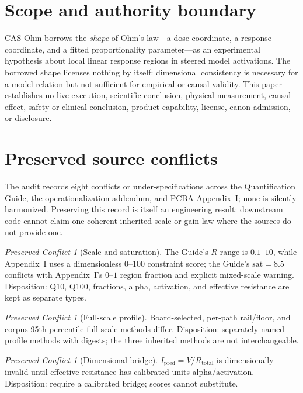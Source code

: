 \documentclass[11pt]{amsart}
\theoremstyle{definition}
\theoremstyle{remark}
\newtheorem{conflict}[theorem]{Preserved Conflict}
\begin{document}
\maketitle

\section{Scope and authority boundary}

CAS-Ohm borrows the \emph{shape} of Ohm's law---a dose coordinate, a response coordinate, and a fitted proportionality parameter---as an experimental hypothesis about local linear response regions in steered model activations. The borrowed shape licenses nothing by itself: dimensional consistency is necessary for a model relation \cite{buckingham} but not sufficient for empirical or causal validity. This paper establishes no live execution, scientific conclusion, physical measurement, causal effect, safety or clinical conclusion, product capability, license, canon admission, or disclosure.

\section{Preserved source conflicts}

The audit records eight conflicts or under-specifications across the Quantification Guide, the operationalization addendum, and PCBA Appendix~I; none is silently harmonized. Preserving this record is itself an engineering result: downstream code cannot claim one coherent inherited scale or gain law where the sources do not provide one.

\begin{conflict}[Scale and saturation]
The Guide's $R$ range is $0.1$--$10$, while Appendix~I uses a dimensionless $0$--$100$ constraint score; the Guide's $\mathrm{sat}=8.5$ conflicts with Appendix~I's $0$--$1$ region fraction and explicit mixed-scale warning. Disposition: Q10, Q100, fractions, alpha, activation, and effective resistance are kept as separate types.
\end{conflict}

\begin{conflict}[Full-scale profile]
Board-selected, per-path rail/floor, and corpus 95th-percentile full-scale methods differ. Disposition: separately named profile methods with digests; the three inherited methods are not interchangeable.
\end{conflict}

\begin{conflict}[Dimensional bridge]
$I_{\mathrm{pred}}=V/R_{\mathrm{total}}$ is dimensionally invalid until effective resistance has calibrated units $\mathrm{alpha}/\mathrm{activation}$. Disposition: require a calibrated bridge; scores cannot substitute.
\end{conflict}
\end{document}
